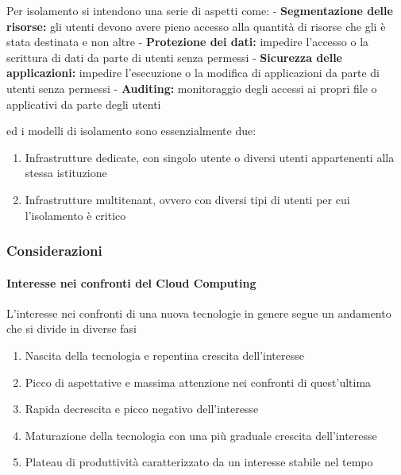 \documentclass[italian,]{article}
\providecommand{\tightlist}{%
  \setlength{\itemsep}{0pt}\setlength{\parskip}{0pt}}
\let\oldparagraph\paragraph
\renewcommand{\paragraph}[1]{\oldparagraph{#1}\mbox{}}
\begin{document}
Per isolamento si intendono una serie di aspetti come: -
\textbf{Segmentazione delle risorse:} gli utenti devono avere pieno
accesso alla quantità di risorse che gli è stata destinata e non altre -
\textbf{Protezione dei dati:} impedire l'accesso o la scrittura di dati
da parte di utenti senza permessi - \textbf{Sicurezza delle
applicazioni:} impedire l'esecuzione o la modifica di applicazioni da
parte di utenti senza permessi - \textbf{Auditing:} monitoraggio degli
accessi ai propri file o applicativi da parte degli utenti

ed i modelli di isolamento sono essenzialmente due:

\begin{enumerate}
\def\labelenumi{\arabic{enumi}.}
\tightlist
\item
  Infrastrutture dedicate, con singolo utente o diversi utenti
  appartenenti alla stessa istituzione
\item
  Infrastrutture multitenant, ovvero con diversi tipi di utenti per cui
  l'isolamento è critico
\end{enumerate}

\subsubsection{Considerazioni}\label{considerazioni}

\paragraph{Interesse nei confronti del Cloud
Computing}\label{interesse-nei-confronti-del-cloud-computing}

L'interesse nei confronti di una nuova tecnologie in genere segue un
andamento che si divide in diverse fasi

\begin{enumerate}
\def\labelenumi{\arabic{enumi}.}
\tightlist
\item
  Nascita della tecnologia e repentina crescita dell'interesse
\item
  Picco di aspettative e massima attenzione nei confronti di
  quest'ultima
\item
  Rapida decrescita e picco negativo dell'interesse
\item
  Maturazione della tecnologia con una più graduale crescita
  dell'interesse
\item
  Plateau di produttività caratterizzato da un interesse stabile nel
  tempo
\end{enumerate}
\end{document}
